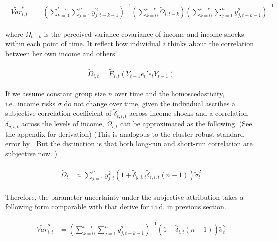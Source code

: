 \documentclass[12pt,notitlepage,onecolumn,aps,pra]{article}
\begin{document}
\begin{eqnarray}
\begin{split}
\tilde {Var}^{\rho}_{i,t} & =   (\sum^{t-c}_{k=0}\sum^{n}_{j=1}y^2_{j,t-k-1})^{-1}(\sum^{t-c}_{k=0}\tilde \Omega_{i,t-k})(\sum^{t-c}_{k=0}\sum^{n}_{j=1}y^2_{j,t-k-1})^{-1}
\end{split}
\end{eqnarray}

where \(\tilde \Omega_{t-k}\) is the perceived variance-covariance of
income and income shocks within each point of time. It reflect how
individual \(i\) thinks about the correlation between her own income and
others'.

\begin{eqnarray}
\begin{split}
\tilde \Omega_{i,t} = \tilde E_{i,t}(Y_{t-1}e_{t}'e_{t}Y_{t-1})
\end{split}
\end{eqnarray}

If we assume constant group size \(n\) over time and the
homoscedasticity, i.e.~income risks \(\sigma\) do not change over time,
given the individual ascribes a subjective correlation coefficient of
\(\tilde \delta_{\epsilon, i,t}\) across income shocks and a correlation
\(\tilde \delta_{y, i,t}\) across the levels of income,
\(\tilde \Omega_{i,t}\) can be approximated as the following. (See the
appendix for derivation) (This is analogous to the cluster-robust
standard error by \cite{cameron2011robust}. But the distinction is that
both long-run and short-run correlation are subjective now. )

\begin{eqnarray}
\begin{split}
\tilde \Omega_{t} & \approx \sum^{n}_{j=1}y^2_{j,t} (1+\tilde \delta_{y,i,t}\tilde \delta_{\epsilon,i,t}(n-1))\tilde \sigma^2_{t}
\end{split}
\end{eqnarray}

Therefore, the parameter uncertainty under the subjective attribution
takes a following form comparable with that derive for i.i.d. in
previous section.

\begin{eqnarray}
\begin{split}
\tilde {Var}^{\rho}_{i,t} & = (\sum^{t-c}_{k=0}\sum^{n}_{j=1}y^2_{j,t-k-1})^{-1}(1+ \tilde\delta_{i,t}(n-1))\tilde{\sigma}^2_{t}
\end{split}
\end{eqnarray}
\end{document}
